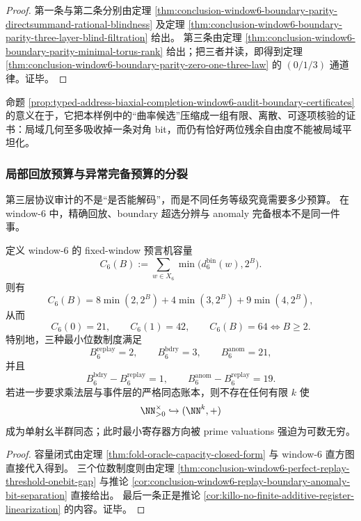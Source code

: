 \begin{proof}
第一条与第二条分别由定理 \ref{thm:conclusion-window6-boundary-parity-directsummand-rational-blindness} 及定理 \ref{thm:conclusion-window6-boundary-parity-three-layer-blind-filtration} 给出。
第三条由定理 \ref{thm:conclusion-window6-boundary-parity-minimal-torus-rank} 给出；把三者并读，即得到定理 \ref{thm:conclusion-window6-boundary-parity-zero-one-three-law} 的 \((0/1/3)\) 通道律。证毕。
\end{proof}

命题 \ref{prop:typed-address-biaxial-completion-window6-audit-boundary-certificates} 的意义在于，它把本样例中的“曲率候选”压缩成一组有限、离散、可逐项核验的证书：局域几何至多吸收掉一条对角 bit，而仍有恰好两位残余自由度不能被局域平坦化。

\subsubsection{局部回放预算与异常完备预算的分裂}\label{subsubsec:typed-address-biaxial-completion-window6-numerical-audit-budget-split}
第三层协议审计的不是“是否能解码”，而是不同任务等级究竟需要多少预算。
在 window-\(6\) 中，精确回放、boundary 超选分辨与 anomaly 完备根本不是同一件事。

\begin{proposition}\label{prop:typed-address-biaxial-completion-window6-audit-budget-split}
定义 window-\(6\) 的 fixed-window 预言机容量
\[
C_6(B):=\sum_{w\in X_6}\min\bigl(d_6^{\mathrm{bin}}(w),2^B\bigr).
\]
则有
\[
C_6(B)=8\min(2,2^B)+4\min(3,2^B)+9\min(4,2^B),
\]
从而
\[
C_6(0)=21,
\qquad
C_6(1)=42,
\qquad
C_6(B)=64\iff B\ge 2.
\]
特别地，三种最小位数制度满足
\[
B_6^{\mathrm{replay}}=2,
\qquad
B_6^{\mathrm{bdry}}=3,
\qquad
B_6^{\mathrm{anom}}=21,
\]
并且
\[
B_6^{\mathrm{bdry}}-B_6^{\mathrm{replay}}=1,
\qquad
B_6^{\mathrm{anom}}-B_6^{\mathrm{replay}}=19.
\]
若进一步要求乘法层与事件层的严格同态账本，则不存在任何有限 \(k\) 使
\[
\NN_{>0}^{\times}\hookrightarrow (\NN^k,+)
\]
成为单射幺半群同态；此时最小寄存器方向被 prime valuations 强迫为可数无穷。
\end{proposition}

\begin{proof}
容量闭式由定理 \ref{thm:fold-oracle-capacity-closed-form} 与 window-\(6\) 直方图直接代入得到。
三个位数制度则由定理 \ref{thm:conclusion-window6-perfect-replay-threshold-onebit-gap} 与推论 \ref{cor:conclusion-window6-replay-boundary-anomaly-bit-separation} 直接给出。
最后一条正是推论 \ref{cor:killo-no-finite-additive-register-linearization} 的内容。证毕。
\end{proof}

